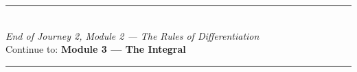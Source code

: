 \documentclass[12pt, a4paper]{article}
\begin{document}
\vspace{1.4cm}
\begin{center}
{\color{MidBlue}\rule{0.5\linewidth}{0.8pt}}\\[6pt]
{\small\color{DarkGrey}\textit{End of Journey 2, Module 2 --- The Rules of Differentiation}}\\[4pt]
{\small\color{DarkGrey}Continue to: \textbf{Module 3 --- The Integral}}\\[6pt]
{\color{MidBlue}\rule{0.5\linewidth}{0.8pt}}
\end{center}
\end{document}
